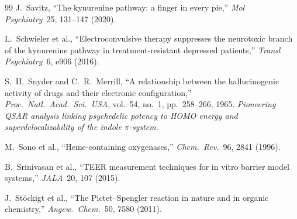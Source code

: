 \begin{thebibliography}{99}
J.~Savitz, ``The kynurenine pathway: a finger in every pie,'' \emph{Mol Psychiatry}\ 25, 131--147 (2020).

L.~Schwieler et al., ``Electroconvulsive therapy suppresses the neurotoxic branch of the kynurenine pathway in treatment-resistant depressed patients,'' \emph{Transl Psychiatry}\ 6, e906 (2016).

S.~H.~Snyder and C.~R.~Merrill,
``A relationship between the hallucinogenic activity of drugs and their electronic configuration,''
\emph{Proc.\ Natl.\ Acad.\ Sci.\ USA}, vol.~54, no.~1, pp.~258--266, 1965.
\textit{Pioneering QSAR analysis linking psychedelic potency to HOMO energy and superdelocalizability of the indole $\pi$-system.}

M.~Sono et al., ``Heme-containing oxygenases,'' \emph{Chem.\ Rev.}\ 96, 2841 (1996).

B.~Srinivasan et al., ``TEER measurement techniques for in vitro barrier model systems,'' \emph{JALA}\ 20, 107 (2015).

J.~St\"ockigt et al., ``The Pictet--Spengler reaction in nature and in organic chemistry,'' \emph{Angew.~Chem.}\ 50, 7580 (2011).

\end{thebibliography}
